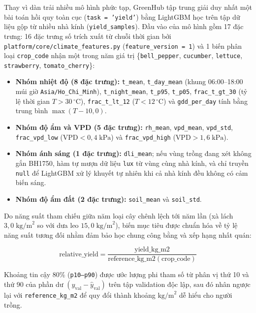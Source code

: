 Thay vì dàn trải nhiều mô hình phức tạp, GreenHub tập trung giải duy nhất một bài toán hồi quy toàn cục (\texttt{task = 'yield'}) bằng LightGBM học trên tập dữ liệu gộp từ nhiều nhà kính (\texttt{yield\_samples}). Đầu vào của mô hình gồm 17 đặc trưng: 16 đặc trưng số trích xuất từ chuỗi thời gian bởi \texttt{platform/core/climate\_features.py} (\texttt{feature\_version = 1}) và 1 biến phân loại \texttt{crop\_code} nhận một trong năm giá trị \{\texttt{bell\_pepper}, \texttt{cucumber}, \texttt{lettuce}, \texttt{strawberry}, \texttt{tomato\_cherry}\}:
\begin{itemize}[leftmargin=*]
    \item \textbf{Nhóm nhiệt độ (8 đặc trưng):} \texttt{t\_mean}, \texttt{t\_day\_mean} (khung 06:00--18:00 múi giờ \texttt{Asia/Ho\_Chi\_Minh}), \texttt{t\_night\_mean}, \texttt{t\_p95}, \texttt{t\_p05}, \texttt{frac\_t\_gt\_30} (tỷ lệ thời gian \(T > 30\,^\circ\text{C}\)), \texttt{frac\_t\_lt\_12} (\(T < 12\,^\circ\text{C}\)) và \texttt{gdd\_per\_day} tính bằng trung bình \(\max(T - 10, 0)\).
    \item \textbf{Nhóm độ ẩm và VPD (5 đặc trưng):} \texttt{rh\_mean}, \texttt{vpd\_mean}, \texttt{vpd\_std}, \texttt{frac\_vpd\_low} (\(\text{VPD} < 0{,}4\;\text{kPa}\)) và \texttt{frac\_vpd\_high} (\(\text{VPD} > 1{,}6\;\text{kPa}\)).
    \item \textbf{Nhóm ánh sáng (1 đặc trưng):} \texttt{dli\_mean}; nếu vùng trồng đang xét không gắn BH1750, hàm tự mượn dữ liệu \texttt{lux} từ vùng cùng nhà kính, và chỉ truyền \texttt{null} để LightGBM xử lý khuyết tự nhiên khi cả nhà kính đều không có cảm biến sáng.
    \item \textbf{Nhóm độ ẩm đất (2 đặc trưng):} \texttt{soil\_mean} và \texttt{soil\_std}.
\end{itemize}

Do năng suất tham chiếu giữa năm loại cây chênh lệch tới năm lần (xà lách \(3{,}0\;\text{kg/m}^2\) so với dưa leo \(15{,}0\;\text{kg/m}^2\)), biến mục tiêu được chuẩn hóa về tỷ lệ năng suất tương đối nhằm đảm bảo học chung công bằng và xếp hạng nhất quán:

\begin{equation}
\text{relative\_yield} = \frac{\text{yield\_kg\_m2}}{\text{reference\_kg\_m2}(\text{crop\_code})}
\end{equation}

Khoảng tin cậy 80\% (\texttt{p10--p90}) được ước lượng phi tham số từ phân vị thứ 10 và thứ 90 của phần dư \((y_{\text{val}} - \hat{y}_{\text{val}})\) trên tập validation độc lập, sau đó nhân ngược lại với \texttt{reference\_kg\_m2} để quy đổi thành khoảng \(\text{kg/m}^2\) dễ hiểu cho người trồng.

